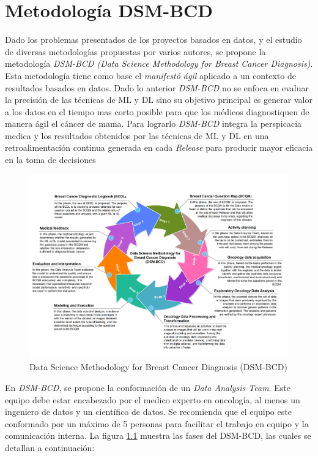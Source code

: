 \chapter{Metodología DSM-BCD}

Dado los problemas presentados de los proyectos basados en datos, y el estudio de diversas metodologías propuestas por varios autores, se propone la metodología \textit{DSM-BCD (Data Science Methodology for Breast Cancer Diagnosis)}. Esta metodología tiene como base el \textit{manifestó ágil} aplicado a un contexto de resultados basados en datos. Dado lo anterior \textit{DSM-BCD} no se enfoca en evaluar la precisión de las técnicas de ML y DL sino su objetivo principal es generar valor a los datos en el tiempo mas corto posible para que los médicos diagnostiquen de manera ágil el cáncer de mama. Para lograrlo \textit{DSM-BCD} integra la perspicacia medica y los resultados obtenidos por las técnicas de ML y DL en una retroalimentación continua generada en cada \textit{Release} para producir mayor eficacia en la toma de decisiones

\begin{figure}[!htb]
	\centering
	\includegraphics[width=0.95
	\linewidth]{IMAGENES/DSM-BCD.pdf}
	\caption{Data Science Methodology for Breast Cancer Diagnosis (DSM-BCD)}
	\label{DSM-BCD}
\end{figure}

 En \textit{DSM-BCD}, se propone la conformación de un \textit{Data Analysis Team}. Este equipo debe estar encabezado por el medico experto en oncología, al menos un ingeniero de datos y un científico de datos. Se recomienda que el equipo este conformado por un máximo de 5 personas para facilitar el trabajo en equipo y la comunicación interna. La figura \ref{DSM-BCD} muestra las fases del DSM-BCD, las cuales se detallan a continuación:


